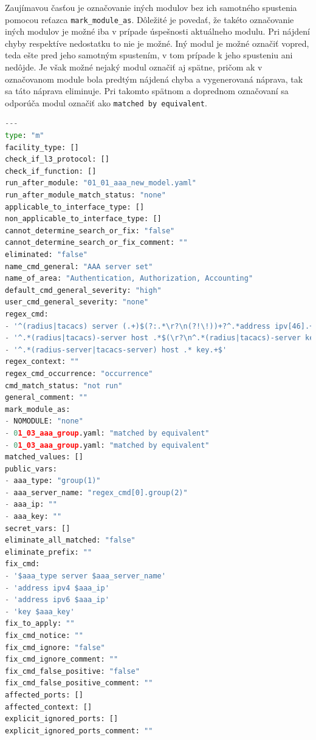 Zaujímavou časťou je označovanie iných modulov bez ich samotného spustenia pomocou reťazca \texttt{mark\_module\_as}. Dôležité je povedať, že takéto označovanie iných modulov je možné iba v prípade úspešnosti aktuálneho modulu. Pri nájdení chyby respektíve nedostatku to nie je možné. Iný modul je možné označiť vopred, teda ešte pred jeho samotným spustením, v tom prípade k jeho spusteniu ani nedôjde. Je však možné nejaký modul označiť aj spätne, pričom ak v označovanom module bola predtým nájdená chyba a vygenerovaná náprava, tak sa táto náprava eliminuje. Pri takomto spätnom a doprednom označovaní sa odporúča modul označiť ako \texttt{matched by equivalent}.


\begin{lstlisting}[frame=single,numbers=right,caption={Konfiguračný súbor \texttt{01\_02\_aaa\_server.yaml}, ktorý popisuje základné informácie o~jednom konkrétnom zariadení},label=yaml:module,basicstyle=\ttfamily\small,rulecolor=\color{black}, keywordstyle=\color{black},language=python,breaklines=true]
---
type: "m"
facility_type: []
check_if_l3_protocol: []
check_if_function: []
run_after_module: "01_01_aaa_new_model.yaml"
run_after_module_match_status: "none"
applicable_to_interface_type: []
non_applicable_to_interface_type: [] 
cannot_determine_search_or_fix: "false" 
cannot_determine_search_or_fix_comment: ""
eliminated: "false" 
name_cmd_general: "AAA server set"
name_of_area: "Authentication, Authorization, Accounting"
default_cmd_general_severity: "high" 
user_cmd_general_severity: "none"
regex_cmd:
- '^(radius|tacacs) server (.+)$(?:.*\r?\n(?!\!))+?^.*address ipv[46].+$(?:\r?\n^.*key.+$)?(?:.*\r?\n)*?(?=\!)'
- '^.*(radius|tacacs)-server host .*$(\r?\n^.*(radius|tacacs)-server key.*$)?'
- '^.*(radius-server|tacacs-server) host .* key.+$'
regex_context: ""
regex_cmd_occurrence: "occurrence"
cmd_match_status: "not run"
general_comment: ""
mark_module_as:
- NOMODULE: "none"
- 01_03_aaa_group.yaml: "matched by equivalent"
- 01_03_aaa_group.yaml: "matched by equivalent"
matched_values: []
public_vars:
- aaa_type: "group(1)"
- aaa_server_name: "regex_cmd[0].group(2)"
- aaa_ip: ""
- aaa_key: ""
secret_vars: []
eliminate_all_matched: "false"
eliminate_prefix: ""
fix_cmd: 
- '$aaa_type server $aaa_server_name'
- 'address ipv4 $aaa_ip'
- 'address ipv6 $aaa_ip'
- 'key $aaa_key'
fix_to_apply: "" 
fix_cmd_notice: ""
fix_cmd_ignore: "false"
fix_cmd_ignore_comment: ""
fix_cmd_false_positive: "false"
fix_cmd_false_positive_comment: "" 
affected_ports: []
affected_context: []
explicit_ignored_ports: []
explicit_ignored_ports_comment: "" 
\end{lstlisting}
\newpage
